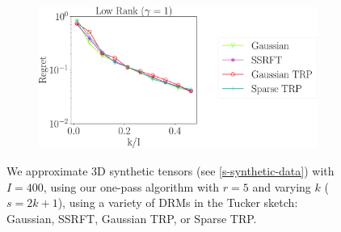 \begin{figure}
	\begin{subfigure}{0.5\textwidth}
		\includegraphics[scale = 0.24]{figure/fig2_lk_hnoise_400.pdf}
	\end{subfigure}
	\caption{We approximate 3D synthetic tensors (see \ref{s-synthetic-data}) with $I = 400$,
		using our one-pass algorithm with $r = 5$ and varying $k$ ($s = 2k+1$),
		using a variety of DRMs in the Tucker sketch:
		Gaussian, SSRFT, Gaussian TRP, or Sparse TRP.}
		\label{fig:vary-k-400-app}
\end{figure}



